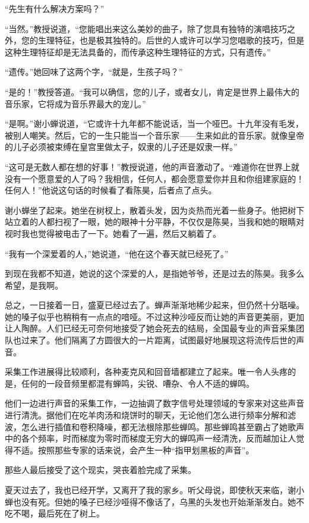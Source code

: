 \documentclass[lang=cn]{elegantpaper}
\begin{document}
“先生有什么解决方案吗？”

“当然。”教授说道，“您能唱出来这么美妙的曲子，除了您具有独特的演唱技巧之外，您的生理特征，也是极其独特的。后世的人或许可以学习您唱歌的技巧，但是这种生理特征却是无法具备的，而传承这种生理特征的方式，只有遗传。”

“遗传。”她回味了这两个字，“就是，生孩子吗？”

“是的！”教授答道。“我可以确信，您的儿子，或者女儿，肯定是世界上最伟大的音乐家，它将成为音乐界最大的宠儿。”

“是啊。”谢小蝉说道，“它或许十九年都不能说话，当一个哑巴。十九年没有毛发，被别人嘲笑。然后，它的一生只能当一个音乐家——生来如此的音乐家。就像皇帝的儿子必须被束缚在皇宫里做太子，奴隶的儿子还是奴隶一样。”

“这可是无数人都在想的好事！”教授说道，他的声音激动了。“难道你在世界上就没有一个愿意爱的人了吗？我相信，任何人，都会愿意爱你并且和你组建家庭的！任何人！”他说这句话的时候看了看陈昊，后者点了点头。

谢小蝉坐了起来。她坐在树杈上，散着头发，因为炎热而光着一些身子。他把树下站立着的人都扫视了一眼，她的眼神十分平静，不仅仅是陈昊，当我和她的眼睛对视时我也觉得被电击了一下。她看了一遍，然后又躺着了。

“我有一个深爱着的人，”她说道，“他在这个春天就已经死了。”

到现在我都不知道，她说的这个深爱的人，是指她爷爷，还是过去的陈昊。我多么希望，是我啊。

总之，一日接着一日，盛夏已经过去了。蝉声渐渐地稀少起来，但仍然十分聒噪。她的嗓子似乎也稍稍有一点点的喑哑。不过这种沙哑反而让她的声音更美丽，更加让人陶醉。人们已经无可奈何地接受了她会死去的结局，全国最专业的声音采集团队也过来了。他们隔离了方圆很大的一片距离，试图最好地展现这将流传后世的声音。

采集工作进展得比较顺利，各种麦克风和回音墙都建立了起来。唯一令人头疼的是，任何的一段音频里都混有蝉鸣，尖锐、嘈杂、令人不适的蝉鸣。

他们一边进行声音的采集工作，一边抽调了数字信号处理领域的专家来对这些声音进行清洗。据他们在吃羊肉汤和烧饼时的聊天，无论他们怎么进行频率分解和滤波，怎么进行插值和卷积降噪，都无法根除那些蝉鸣。那些蝉鸣甚至霸占了她歌声中的各个频率，时而梯度为零时而梯度无穷大的蝉鸣声一经清洗，反而越加让人觉得不适。按照那些专家的话来说，会产生一种“指甲划黑板的声音”。

那些人最后接受了这个现实，哭丧着脸完成了采集。

夏天过去了，我也已经开学，又离开了我的家乡。听父母说，即使秋天来临，谢小蝉也没有死。但她的嗓子已经沙哑得不像话了，乌黑的头发也开始渐渐发白。她不吃不喝，最后死在了树上。
\end{document}

